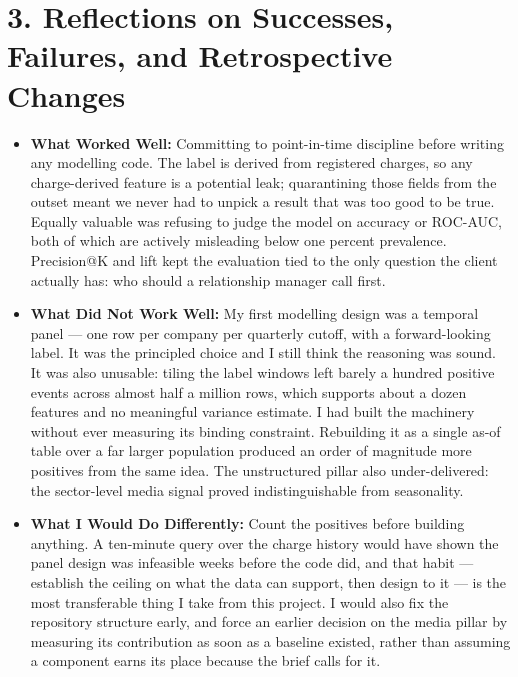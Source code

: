 \documentclass[11pt, a4paper]{article}
\begin{document}
\section*{3. Reflections on Successes, Failures, and Retrospective Changes}
\begin{itemize}
    \item \textbf{What Worked Well:} Committing to point-in-time discipline before writing any
    modelling code. The label is derived from registered charges, so any charge-derived feature
    is a potential leak; quarantining those fields from the outset meant we never had to unpick
    a result that was too good to be true. Equally valuable was refusing to judge the model on
    accuracy or ROC-AUC, both of which are actively misleading below one percent prevalence.
    Precision@K and lift kept the evaluation tied to the only question the client actually has:
    who should a relationship manager call first.

    \item \textbf{What Did Not Work Well:} My first modelling design was a temporal panel ---
    one row per company per quarterly cutoff, with a forward-looking label. It was the
    principled choice and I still think the reasoning was sound. It was also unusable: tiling
    the label windows left barely a hundred positive events across almost half a million rows,
    which supports about a dozen features and no meaningful variance estimate. I had built the
    machinery without ever measuring its binding constraint. Rebuilding it as a single as-of
    table over a far larger population produced an order of magnitude more positives from the
    same idea. The unstructured pillar also under-delivered: the sector-level media signal
    proved indistinguishable from seasonality.

    \item \textbf{What I Would Do Differently:} Count the positives before building anything.
    A ten-minute query over the charge history would have shown the panel design was infeasible
    weeks before the code did, and that habit --- establish the ceiling on what the data can
    support, then design to it --- is the most transferable thing I take from this project. I
    would also fix the repository structure early, and force an earlier decision on the media
    pillar by measuring its contribution as soon as a baseline existed, rather than assuming a
    component earns its place because the brief calls for it.
\end{itemize}
\end{document}
